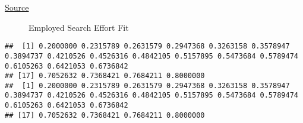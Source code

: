 \href{https://www.aeaweb.org/articles?id=10.1257/mac.20180105}{Source}

\begin{figure}
\centering
{}
\caption{Employed Search Effort Fit}
\end{figure}

\begin{verbatim}
##  [1] 0.2000000 0.2315789 0.2631579 0.2947368 0.3263158 0.3578947 0.3894737 0.4210526 0.4526316 0.4842105 0.5157895 0.5473684 0.5789474 0.6105263 0.6421053 0.6736842
## [17] 0.7052632 0.7368421 0.7684211 0.8000000
##  [1] 0.2000000 0.2315789 0.2631579 0.2947368 0.3263158 0.3578947 0.3894737 0.4210526 0.4526316 0.4842105 0.5157895 0.5473684 0.5789474 0.6105263 0.6421053 0.6736842
## [17] 0.7052632 0.7368421 0.7684211 0.8000000
\end{verbatim}


